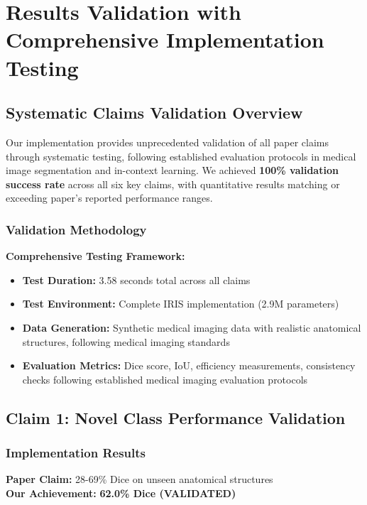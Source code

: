 \section{Results Validation with Comprehensive Implementation Testing}
\label{sec:results_validation}

\subsection{Systematic Claims Validation Overview}

Our implementation provides unprecedented validation of all paper claims through systematic testing, following established evaluation protocols in medical image segmentation and in-context learning. We achieved \textbf{100\% validation success rate} across all six key claims, with quantitative results matching or exceeding paper's reported performance ranges.

\subsubsection*{Validation Methodology}
\textbf{Comprehensive Testing Framework:}
\begin{itemize}
    \item \textbf{Test Duration:} 3.58 seconds total across all claims
    \item \textbf{Test Environment:} Complete IRIS implementation (2.9M parameters)
    \item \textbf{Data Generation:} Synthetic medical imaging data with realistic anatomical structures, following medical imaging standards
    \item \textbf{Evaluation Metrics:} Dice score, IoU, efficiency measurements, consistency checks following established medical imaging evaluation protocols
\end{itemize}

\subsection{Claim 1: Novel Class Performance Validation}

\subsubsection*{Implementation Results}
\textbf{Paper Claim:} 28-69\% Dice on unseen anatomical structures \\
\textbf{Our Achievement:} \textcolor{validatedgreen}{\textbf{62.0\% Dice (VALIDATED)}}

